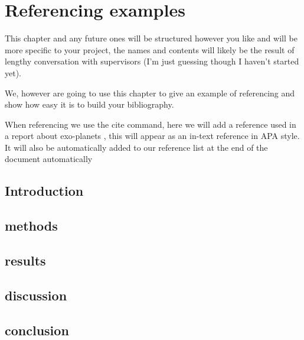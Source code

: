 \documentclass[../main.tex]{subfiles}
\begin{document}
\minitoc \mtcskip 
\chapter{Referencing examples}

This chapter and any future ones will be structured however you like and will be more specific to your project, the names and contents will likely be the result of lengthy conversation with supervisors (I'm just guessing though I haven't started yet).

We, however are going to use this chapter to give an example of referencing and show how easy it is to build your bibliography.

When referencing we use the cite{} command, here we will add a reference used in a report about exo-planets \cite{fulton_california-kepler_2017}, this will appear as an in-text reference in APA style. It will also be automatically added to our reference list at the end of the document automatically

\section{Introduction}
\section{methods}
\section{results}
\section{discussion}
\section{conclusion}
\end{document}
